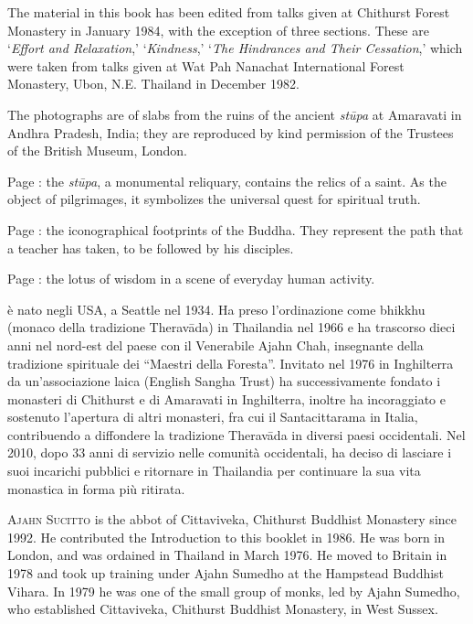 
{\centering\par
\Large\scshape\chapTitleFont\thetitle
\par}
\vspace*{2\baselineskip}

{%
\setlength{\parskip}{1.5em}
\setlength{\parindent}{0pt}

The material in this book has been edited from talks given at Chithurst Forest Monastery in January 1984, with the exception of three sections. These are `\textit{Effort and Relaxation},' `\textit{Kindness},' `\textit{The Hindrances and Their Cessation},' which were taken from talks given at Wat Pah Nanachat International Forest Monastery, Ubon, N.E. Thailand in December 1982.

The photographs are of slabs from the ruins of the ancient \textit{stūpa} at Amaravati in Andhra Pradesh, India; they are reproduced by kind permission of the Trustees of the British Museum, London.

Page \pageref{image-stupa}: the \textit{stūpa}, a monumental reliquary, contains the relics of a saint. As the object of pilgrimages, it symbolizes the universal quest for spiritual truth.

Page \pageref{image-feet}: the iconographical footprints of the Buddha. They represent the path that a teacher has taken, to be followed by his disciples.

Page \pageref{image-lotus-scene}: the lotus of wisdom in a scene of everyday human activity.

\clearpage
\thispagestyle{empty}

{\scshape \theauthor} è nato negli USA, a Seattle nel 1934. Ha
preso l'ordinazione come bhikkhu (monaco della tradizione Theravāda) in
Thailandia nel 1966 e ha trascorso dieci anni nel nord-est del paese con
il Venerabile Ajahn Chah, insegnante della tradizione spirituale dei
“Maestri della Foresta”. Invitato nel 1976 in Inghilterra da
un'associazione laica (English Sangha Trust) ha successivamente fondato
i monasteri di Chithurst e di Amaravati in Inghilterra, inoltre ha
incoraggiato e sostenuto l'apertura di altri monasteri, fra cui il
Santacittarama in Italia, contribuendo a diffondere la tradizione
Theravāda in diversi paesi occidentali. Nel 2010, dopo 33 anni di
servizio nelle comunità occidentali, ha deciso di lasciare i suoi
incarichi pubblici e ritornare in Thailandia per continuare la sua vita
monastica in forma più ritirata.

{\scshape Ajahn Sucitto} is the abbot of Cittaviveka, Chithurst Buddhist Monastery since 1992. He contributed the Introduction to this booklet in 1986. He was born in London, and was ordained in Thailand in March 1976. He moved to Britain in 1978 and took up training under Ajahn Sumedho at the Hampstead Buddhist Vihara. In 1979 he was one of the small group of monks, led by Ajahn Sumedho, who established Cittaviveka, Chithurst Buddhist Monastery, in West Sussex.


}

